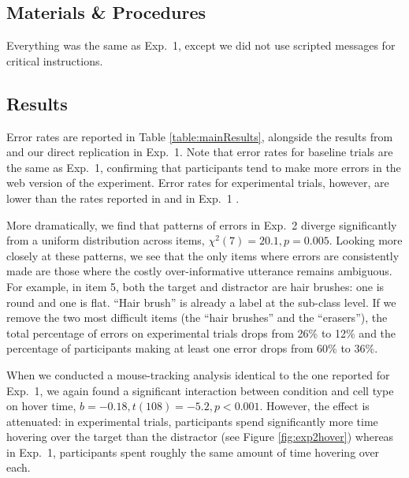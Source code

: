 \documentclass[10pt,letterpaper]{article}
\begin{document}
\subsection{Materials \& Procedures}

Everything was the same as Exp.~1, except we did not use scripted messages for critical instructions. 
 
\subsection{Results}

Error rates are reported in Table \ref{table:mainResults}, alongside the results from  and our direct replication in Exp.~1. Note that error rates for baseline trials are the same as Exp.~1, confirming that participants tend to make more errors in the web version of the experiment. Error rates for experimental trials, however, are lower than the rates reported in  and in Exp.~1 . 

More dramatically, we find that patterns of errors in Exp.~2 diverge significantly from a uniform distribution across items, $\chi^2(7) = 20.1, p = 0.005$. Looking more closely at these patterns, we see that the only items where errors are consistently made are those where the costly over-informative utterance remains ambiguous. For example, in item 5, both the target and distractor are hair brushes: one is round and one is flat. ``Hair brush'' is already a label at the sub-class level. If we remove the two most difficult items (the ``hair brushes'' and the ``erasers''), the total percentage of errors on experimental trials drops from 26\% to 12\% and the percentage of participants making at least one error drops from 60\% to 36\%.


When we conducted a mouse-tracking analysis identical to the one reported for Exp.~1, we again found a significant interaction between condition and cell type on hover time, $b = -0.18, t(108) = -5.2, p < 0.001$. However, the effect is attenuated: in experimental trials, participants spend significantly more time hovering over the target than the distractor (see Figure \ref{fig:exp2hover}) whereas in Exp.~1, participants spent roughly the same amount of time hovering over each.
\end{document}
